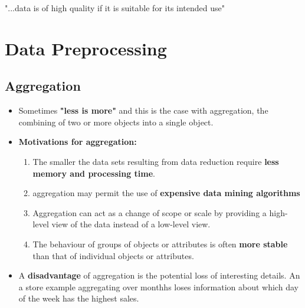 		{\LARGE "...data is of high quality if it is suitable for its intended use"}



\section{Data Preprocessing}
	
	\subsection{Aggregation}
		\begin{itemize}
			\item Sometimes {\bf "less is more"} and this is the case with aggregation, 
			the combining of two or more objects into a single object. 
			\item {\bf Motivations for aggregation:}
				\begin{enumerate}
					\item The smaller the data sets resulting from data reduction
					require {\bf less memory and processing time}.
					\item aggregation may permit the use of {\bf expensive data mining 
					algorithms}
					\item Aggregation can act as a change of scope or scale by providing a
					high-level view of the data instead of a low-level view. 
					\item The behaviour of groups of objects or attributes is often {\bf more
					stable} than that of individual objects or attributes. 
				\end{enumerate}
			\item A {\bf disadvantage} of aggregation is the potential loss of interesting details. 
			An a store example aggregating over monthhs loses information about which day of the
			week has the highest sales. 
		\end{itemize}

